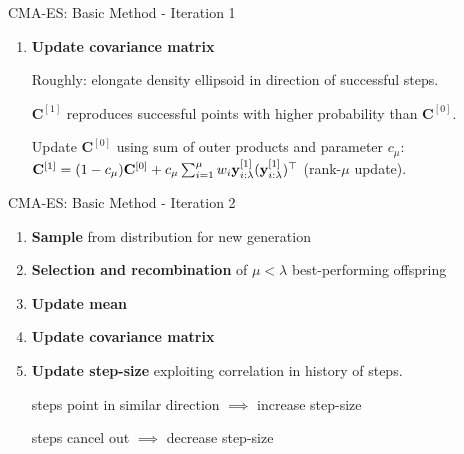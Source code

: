 \documentclass[11pt,compress,t,notes=noshow, xcolor=table]{beamer}
\begin{document}
\begin{vbframe}{CMA-ES: Basic Method - Iteration 1}
\begin{enumerate}
    \item \textbf{Update covariance matrix} %
    
        Roughly: elongate density ellipsoid in direction of successful steps.
        
        $\mathbf{C}^{[1]}$ reproduces successful points with higher probability than $\mathbf{C}^{[0]}$. %
        
        \vspace{-0.5cm}

        \begin{small}
            Update $\mathbf{C}^{[0]}$ using sum of outer products and parameter $c_{\mu}$: %
            $\mathbf{C}^{[1]} = (1-c_{\mu}) \mathbf{C}^{[0]} + c_{\mu} \sum_{i=1}^{\mu} w_i \mathbf{y}_{i:\lambda}^{[1]}(\mathbf{y}_{i:\lambda}^{[1]})^{\top}$ (rank-$\mu$ update).
        \end{small}

\end{enumerate}
\end{vbframe}

\begin{vbframe}{CMA-ES: Basic Method - Iteration 2}
\begin{enumerate}
    \item \textbf{Sample} from distribution for new generation

    \framebreak
    
    \item \textbf{Selection and recombination} of $\mu<\lambda$ best-performing offspring
\item \textbf{Update mean}

    \item \textbf{Update covariance matrix} %

    \item \textbf{Update step-size} exploiting correlation in history of steps.
    
        steps point in similar direction $\implies$ increase step-size
        
        steps cancel out $\implies$ decrease step-size
        

\end{enumerate}
\end{vbframe}
\end{document}
